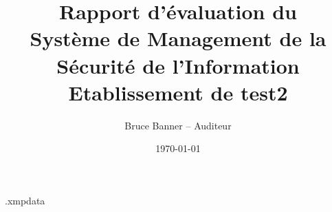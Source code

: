 \begin{filecontents*}{\jobname.xmpdata}
\end{filecontents*}

\documentclass[a4paper,10pt]{article}



\title{Rapport d'évaluation du\\Système de Management de la Sécurité de l'Information\\ \textcolor{myRed}{Etablissement de test2}}

\author{Bruce Banner -- \textcolor{myRed}{Auditeur}}

\date{\today}



\renewcommand{\labelitemi}{\ensuremath{\bullet}}
\renewcommand{\labelitemii}{\ensuremath{\circ}}
\renewcommand{\labelitemiii}{\ensuremath{\triangleright}}

\maketitle

\bigskip\bigskip\bigskip


\bigskip\bigskip\bigskip

\begin{itemize}
\item Directeur de l'établissement: \textsl{ }
\item RSSI de l'établissement: \textsl{Hank Pym}
\end{itemize}

\bigskip\bigskip\bigskip

\begin{center}
\Large{\textcolor{myRed}{Rapport validé}}
\end{center}

\bigskip\bigskip\bigskip

\begin{flushright}
\textcolor{myRed}{Original signé}

\textcolor{myRed}{Bruce Banner}\end{flushright}


